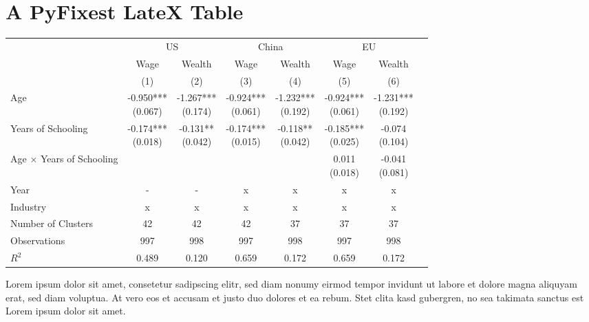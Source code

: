 \documentclass{article}%
\begin{document}
%
\normalsize%
\section{A PyFixest LateX Table}%
\label{sec:APyFixestLateXTable}%


\begin{table}[htbp]%
\renewcommand\cellalign{t}
\begin{threeparttable}
\begin{tabular}{lccccccc}
\toprule
 & \multicolumn{2}{c}{US} & \multicolumn{2}{c}{China} & \multicolumn{2}{c}{EU} \\
\cmidrule(lr){2-3} \cmidrule(lr){4-5} \cmidrule(lr){6-7}
 & Wage & Wealth & Wage & Wealth & Wage & Wealth \\
 & (1) & (2) & (3) & (4) & (5) & (6) \\
\midrule
\addlinespace
Age & \makecell{-0.950*** \\ (0.067)} & \makecell{-1.267*** \\ (0.174)} & \makecell{-0.924*** \\ (0.061)} & \makecell{-1.232*** \\ (0.192)} & \makecell{-0.924*** \\ (0.061)} & \makecell{-1.231*** \\ (0.192)} \\
Years of Schooling & \makecell{-0.174*** \\ (0.018)} & \makecell{-0.131** \\ (0.042)} & \makecell{-0.174*** \\ (0.015)} & \makecell{-0.118** \\ (0.042)} & \makecell{-0.185*** \\ (0.025)} & \makecell{-0.074 \\ (0.104)} \\
Age $\times$ Years of Schooling &  &  &  &  & \makecell{0.011 \\ (0.018)} & \makecell{-0.041 \\ (0.081)} \\
\midrule
\addlinespace
Year & - & - & x & x & x & x \\
Industry & x & x & x & x & x & x \\
\midrule
\addlinespace
Number of Clusters & 42 & 42 & 42 & 37 & 37 & 37 \\
Observations & 997 & 998 & 997 & 998 & 997 & 998 \\
$R^2$ & 0.489 & 0.120 & 0.659 & 0.172 & 0.659 & 0.172 \\
\bottomrule
\end{tabular}
\footnotesize Lorem ipsum dolor sit amet, consetetur sadipscing elitr, sed diam nonumy eirmod tempor invidunt ut labore et dolore magna aliquyam erat, sed diam voluptua. At vero eos et accusam et justo duo dolores et ea rebum. Stet clita kasd gubergren, no sea takimata sanctus est Lorem ipsum dolor sit amet.
\end{threeparttable}%
\end{table}

%
\end{document}
